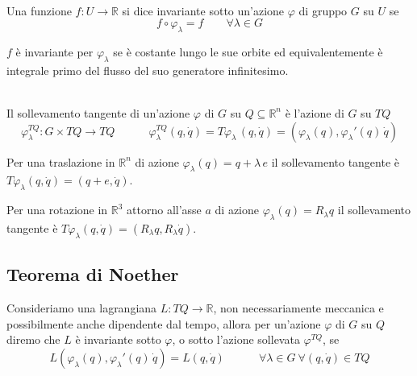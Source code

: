 \documentclass[11pt,a4paper,twoside]{book}
\newenvironment{definizione}[1][\empty]{\begin{Definizione}{
\ifx\empty#1\relax\else\mdseries\itshape#1\\\fi
}{}}{\end{Definizione}}
\newenvironment{esempio}[1][Esempio]{ 
  \begin{center}\begin{tcolorbox}[
  title={#1:\\},
  width=0.9\linewidth,
  flush right,
  enhanced jigsaw, 
  colback=white, 
  frame hidden, 
  sharpish corners, arc=3mm,
  borderline west = {1pt}{0pt}{gray},
  borderline south = {1pt}{0pt}{gray},
  coltitle=black, 
  fonttitle=\small\bfseries, 
  attach title to upper, 
  breakable,
  top=2.5pt, bottom=0.3pt]\small
  }{
 \normalsize \end{tcolorbox}\end{center}
}
\theoremstyle{esss}
\theoremstyle{dotless}
\numberwithin{equation}{section} %
\begin{document}
\begin{definizione}
Una funzione $f:U\rightarrow\mathbb{R}$ si dice invariante sotto un'azione $\varphi$ di gruppo $G$ su $U$ se 
\[
f\circ\varphi_\lambda=f \qquad \forall \lambda \in G
\]

\end{definizione}
$f$ è invariante per $\varphi_\lambda$ se è costante lungo le sue orbite ed equivalentemente è integrale primo del flusso del suo generatore infinitesimo.

\begin{definizione}
Il sollevamento tangente di un'azione $\varphi$ di $G$ su $Q\subseteq\mathbb{R}^n$ è l'azione di $G$ su $TQ$ 
\[
\varphi^{TQ}_\lambda :G\times TQ \rightarrow TQ \qquad \quad \varphi_\lambda^{TQ}(q,\dot{q})=T\varphi_\lambda \, (q,\dot{q})=(\varphi_\lambda(q),\varphi_\lambda'(q)\,\dot{q})
\]
\end{definizione}
\begin{esempio}
Per una traslazione in $\mathbb{R}^n$ di azione $\varphi_\lambda(q)=q+\lambda\, e$ il sollevamento tangente è $T\varphi_\lambda (q,\dot{q})=(q+e,\dot{q})$.

Per una rotazione in $\mathbb{R}^3$ attorno all'asse $a$ di azione $\varphi_\lambda(q)=R_\lambda q$ il sollevamento tangente è $T\varphi_\lambda(q,\dot{q})=(R_\lambda q, R_\lambda \dot{q})$.
\end{esempio}
\subsection{Teorema di Noether}
Consideriamo una lagrangiana $L:TQ\rightarrow\mathbb{R}$, non necessariamente meccanica e possibilmente anche dipendente dal tempo, allora per un'azione $\varphi$ di $G$ su $Q$ diremo che $L$ è invariante sotto $\varphi$, o sotto l'azione sollevata $\varphi^{TQ}$, se 
\begin{equation}
L(\varphi_\lambda(q),\varphi_\lambda'(q)\,\dot{q})=L(q,\dot{q}) \qquad \quad \forall  \lambda\in G \> \forall (q,\dot{q})\in TQ
\end{equation}
\end{document}

